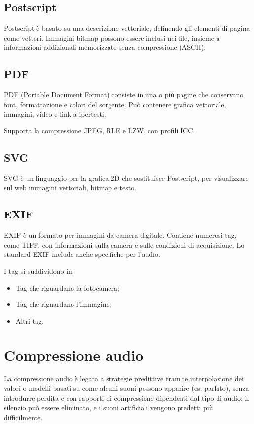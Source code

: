  \subsection{Postscript}
 Postscript è basato su una descrizione vettoriale, definendo gli elementi di pagina come vettori. Immagini bitmap possono essere inclusi nei file, insieme a informazioni addizionali memorizzate senza compressione (ASCII).
 
 \subsection{PDF}
 PDF (Portable Document Format) consiste in una o più pagine che conservano font, formattazione e colori del sorgente. Può contenere grafica vettoriale, immagini, video e link a ipertesti.
 
 Supporta la compressione JPEG, RLE e LZW, con profili ICC.
 
 \subsection{SVG}
 SVG è un linguaggio per la grafica 2D che sostituisce Postscript, per visualizzare sul web immagini vettoriali, bitmap e testo.
 
 \subsection{EXIF}
 EXIF è un formato per immagini da camera digitale. Contiene numerosi tag, come TIFF, con informazioni sulla camera e sulle condizioni di acquisizione. Lo standard EXIF include anche specifiche per l'audio.
 
 I tag si suddividono in:
 \begin{itemize}
 	\item Tag che riguardano la fotocamera;
 	\item Tag che riguardano l'immagine;
 	\item Altri tag.
 \end{itemize}
 
 \section{Compressione audio}
 La compressione audio è legata a strategie predittive tramite interpolazione dei valori o modelli basati su come alcuni suoni possono apparire (es. parlato), senza introdurre perdita e con rapporti di compressione dipendenti dal tipo di audio: il silenzio può essere eliminato, e i suoni artificiali vengono predetti più difficilmente.
 
